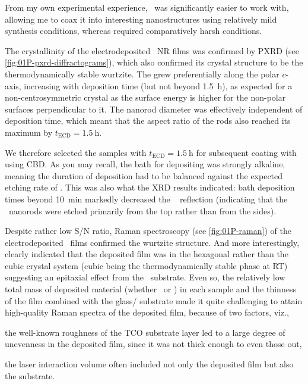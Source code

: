 \documentclass[webedition,openright,titles,swedish,english]{LuaUUThesis}\usepackage[]{graphicx}\usepackage[]{xcolor}
\newcommand{\viz}{viz.}
\newcommand{\namely}{\viz}
\begin{document}
From my own experimental experience, \ZnO\ was significantly easier
to work with, allowing me to coax it into interesting nanostructures
using relatively mild synthesis conditions, whereas  required
comparatively harsh conditions.

The crystallinity of the electrodeposited \ZnO\ \gls{NR} films was confirmed
by \gls{PXRD} (see \cref{fig:01P-pxrd-diffractograms}), which also
confirmed its crystal structure to be the thermodynamically stable wurtzite.
The  grew preferentially along the polar $c$-axis, increasing
with deposition time (but not beyond \qty{1.5}{\hour}), as expected
for a non-centrosymmetric crystal as the surface energy is higher for the
non-polar surfaces perpendicular to it.
The nanorod diameter was effectively independent of deposition time, which meant
that the aspect ratio of the rods also reached its maximum by $t_\mathrm{ECD}=\qty{1.5}{\hour}$.

We therefore selected the samples with $t_\mathrm{ECD}=\qty{1.5}{\hour}$ for
subsequent coating with  using \gls{CBD}.
As you may recall, the bath for depositing  was strongly alkaline, meaning
the duration of  deposition had to be balanced against the expected
etching rate of \ZnO.
This was also what the \gls{XRD} results indicated:
bath deposition times beyond \qty{10}{\minute} markedly decreased the \zincox\
 reflection (indicating that the \ZnO\ nanorods were etched primarily
from the top rather than from the sides).


Despite rather low S/N ratio, Raman spectroscopy (see \cref{fig:01P-raman}) of the
electrodeposited \ZnO\ films confirmed the wurtzite structure. And more interestingly,
clearly indicated that the deposited  film was in the hexagonal rather than
the cubic crystal system (cubic \ch{CdS} being the thermodynamically stable phase at \gls{RT})
suggesting an epitaxial effect from the \ZnO\ substrate.
Even so, the relatively low total mass of deposited material (whether \ZnO\ or )
in each sample and the thinness of the film combined with the glass/\glsxtrshort{TCO} substrate
made it quite challenging to attain high-quality Raman spectra of the deposited film,
because of two factors, \namely,
\begin{enumerate*}[label=(\alph*)]
\item the well-known roughness of the \gls{TCO} substrate layer led to a large
   degree of unevenness in the deposited film, since it was not thick enough
   to even those out,
\item the laser interaction volume often included not only the deposited film
   but also the \glsxtrshort{TCO} substrate.
\end{enumerate*}
\end{document}
